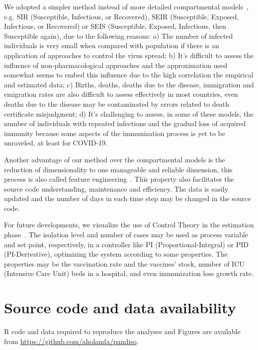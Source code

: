 \documentclass[review]{elsarticle}
\def\covid{\hbox{COVID-19}} %
\begin{document}
We adopted a simpler method instead of more detailed 
compartmental models~\cite{Ross1916,Ross1917a,Ross1917b}, 
e.g. SIR (Susceptible, Infectious, or Recovered), SEIR (Susceptible, Exposed, Infectious, or Recovered) 
or SEIS (Susceptible, Exposed, Infectious, then Susceptible again), due to the following reasons: 
a) The number of infected individuals is very small when compared with population if there is 
    an application of approaches to control the virus spread; 
b) It's difficult to assess the influence of non-pharmacological approaches and the approximation 
    used somewhat seems to embed this influence due to the high correlation 
   the empirical and estimated data; 
c) Births, deaths, deaths due to the disease, immigration and emigration rates 
   are also difficult to assess effectively in most countries, 
   even deaths due to the disease 
   may be contaminated by errors related to death certificate misjudgment; 
d) It's challenging to assess, in some of these models, the number of 
    individuals with repeated infections and the gradual loss of acquired 
    immunity because some aspects of the immunization process is 
   yet to be unraveled, at least for \covid.

Another advantage of our method over the compartmental models is the 
 reduction of dimensionality to one manageable and reliable dimension, 
this process is also called feature engineering~\cite{Spieg2019}. 
This property also facilitates the source code 
understanding, maintenance and efficiency. 
The data is easily updated and the number of days in each time step 
may be changed in the source code.

For future developments, we visualize the use of Control Theory 
in the estimation phase~\cite{Stewart2020}. 
The isolation level and number of cases 
may be used as process variable and set point, respectively, 
in a controller like PI (Proportional-Integral) or PID (PI-Derivative), 
optimizing the system according to some properties. 
The properties may be the vaccination rate and the vaccines’ stock, 
number of ICU (Intensive Care Unit) beds in a hospital, 
and even immunization loss growth rate.

\section{Source code and data availability}
R code and data required to reproduce the analyses 
and Figures are available from
\url{https://github.com/aholanda/pandiso}.


\end{document}
